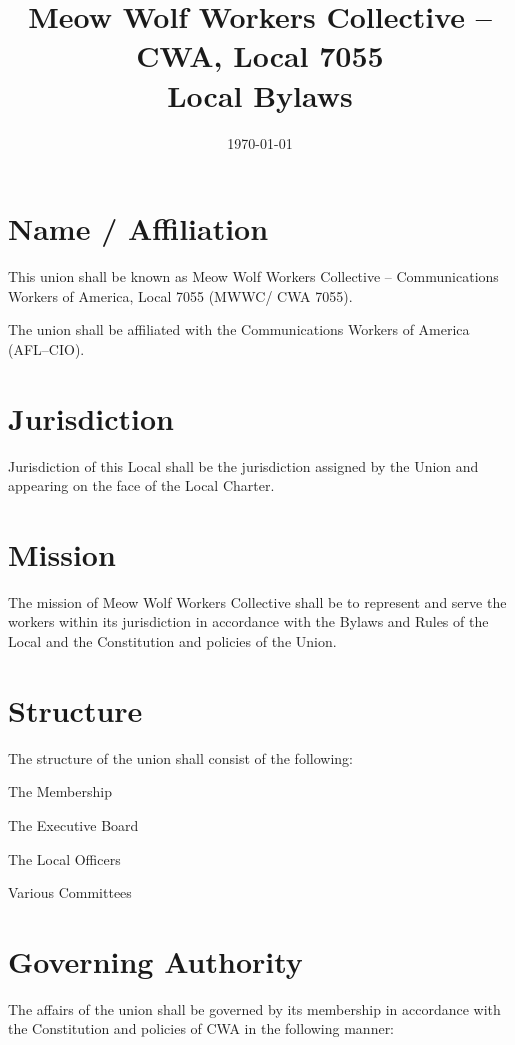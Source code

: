 \documentclass[12pt]{article}
\title{Meow Wolf Workers Collective \--- CWA, Local 7055 \\ Local Bylaws}
\date{\today}
\begin{document}
\maketitle

\tableofcontents
{}
\newpage

\section{Name / Affiliation}
This union shall be known as Meow Wolf Workers Collective – Communications Workers of America, Local 7055 (MWWC/ CWA 7055).

The union shall be affiliated with the Communications Workers of America (AFL–CIO).

\section{Jurisdiction}
Jurisdiction of this Local shall be the jurisdiction assigned by the Union and appearing on the face of the Local Charter.

\section{Mission}
The mission of Meow Wolf Workers Collective shall be to represent and serve the workers within its jurisdiction in accordance with the Bylaws and Rules of the Local and the Constitution and policies of the Union.

\section{Structure}
The structure of the union shall consist of the following:

\begin{numberlist}
\item The Membership
\item The Executive Board
\item The Local Officers
\item Various Committees
\end{numberlist}

\section{Governing Authority}

The affairs of the union shall be governed by its membership in accordance with the Constitution and policies of CWA in the following manner:
\end{document}
